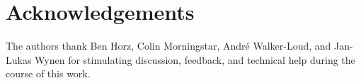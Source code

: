 \section*{Acknowledgements}\label{sec:acknowledgements}

The authors thank
Ben Horz,
Colin Morningstar,
Andr\'{e} Walker-Loud,
and
Jan-Lukas Wynen
for stimulating discussion, feedback, and technical help during the course of this work.
